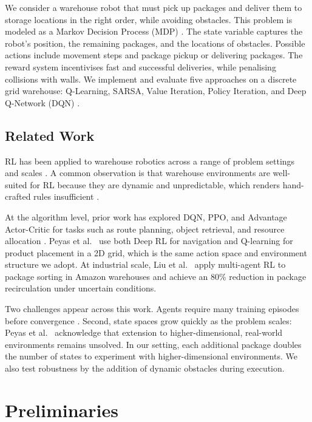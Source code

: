 \documentclass[a4paper,11pt]{article}
\theoremstyle{definition}
\begin{document}
We consider a warehouse robot that must pick up packages and deliver them to storage locations in the right order, while avoiding obstacles. This problem is modeled as a Markov Decision Process (MDP) \cite{sutton2018}. The state variable captures the robot's position, the remaining packages, and the locations of obstacles. Possible actions include movement steps and package pickup or delivering packages. The reward system incentivises fast and successful deliveries, while penalising collisions with walls. We implement and evaluate five approaches on a discrete grid warehouse: Q-Learning, SARSA, Value Iteration, Policy Iteration, and Deep Q-Network (DQN) \cite{mnih2015}.
\subsection*{Related Work}
RL has been applied to warehouse robotics across a range of problem settings and scales \cite{punukollu2019integrating, peyas2021warehouse, liu2025drmarl}. A common observation is that warehouse environments are well-suited for RL because they are dynamic and unpredictable, which renders hand-crafted rules insufficient \cite{peyas2021warehouse}.

At the algorithm level, prior work has explored DQN, PPO, and Advantage Actor-Critic for tasks such as route planning, object retrieval, and resource allocation \cite{punukollu2019integrating}. Peyas et al.\ \cite{peyas2021warehouse} use both Deep RL for navigation and Q-learning for product placement in a 2D grid, which is the same action space and environment structure we adopt. At industrial scale, Liu et al.\ \cite{liu2025drmarl} apply multi-agent RL to package sorting in Amazon warehouses and achieve an 80\% reduction in package recirculation under uncertain conditions.

Two challenges appear across this work. Agents require many training episodes before convergence \cite{punukollu2019integrating}. Second, state spaces grow quickly as the problem scales: Peyas et al.\ \cite{peyas2021warehouse} acknowledge that extension to higher-dimensional, real-world environments remains unsolved. In our setting, each additional package doubles the number of states to experiment with higher-dimensional environments. We also test robustness by the addition of dynamic obstacles during execution.

\section{Preliminaries}
\end{document}

